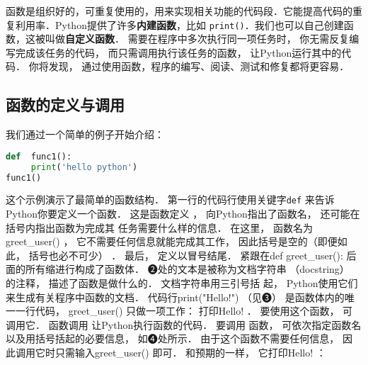 函数是组织好的，可重复使用的，用来实现相关功能的代码段．它能提高代码的重复利用率．Python提供了许多\textbf{内建函数}，比如 \verb|print()|．我们也可以自己创建函数，这被叫做\textbf{自定义函数}． 需要在程序中多次执行同一项任务时， 你无需反复编写完成该任务的代码， 而只需调用执行该任务的函数， 让Python运行其中的代码． 你将发现， 通过使用函数，程序的编写、阅读、测试和修复都将更容易．

\subsection{函数的定义与调用}
我们通过一个简单的例子开始介绍：
\begin{lstlisting}[language=python]
def  func1():
     print('hello python')
func1()
\end{lstlisting}
这个示例演示了最简单的函数结构． 第一行的代码行使用关键字\verb|def| 来告诉Python你要定义一个函数． 这是函数定义 ， 向Python指出了函数名， 还可能在括号内指出函数为完成其
任务需要什么样的信息． 在这里， 函数名为greet_user() ， 它不需要任何信息就能完成其工作， 因此括号是空的（即便如此， 括号也必不可少） ． 最后， 定义以冒号结尾．
紧跟在def greet_user(): 后面的所有缩进行构成了函数体． ❷处的文本是被称为文档字符串 （docstring） 的注释， 描述了函数是做什么的． 文档字符串用三引号括
起， Python使用它们来生成有关程序中函数的文档．
代码行print("Hello!") （见❸） 是函数体内的唯一一行代码， greet_user() 只做一项工作： 打印Hello! ．
要使用这个函数， 可调用它． 函数调用 让Python执行函数的代码． 要调用 函数， 可依次指定函数名以及用括号括起的必要信息， 如❹处所示． 由于这个函数不需要任何信息， 因
此调用它时只需输入greet_user() 即可． 和预期的一样， 它打印Hello! ：